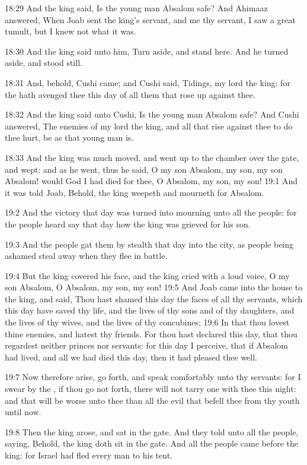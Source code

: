 18:29 And the king said, Is the young man Absalom safe? And Ahimaaz answered, When Joab sent the king's servant, and me thy servant, I saw a great tumult, but I knew not what it was.

18:30 And the king said unto him, Turn aside, and stand here. And he turned aside, and stood still.

18:31 And, behold, Cushi came; and Cushi said, Tidings, my lord the king: for the \LORD hath avenged thee this day of all them that rose up against thee.

18:32 And the king said unto Cushi, Is the young man Absalom safe? And Cushi answered, The enemies of my lord the king, and all that rise against thee to do thee hurt, be as that young man is.

18:33 And the king was much moved, and went up to the chamber over the gate, and wept: and as he went, thus he said, O my son Absalom, my son, my son Absalom! would God I had died for thee, O Absalom, my son, my son!  19:1 And it was told Joab, Behold, the king weepeth and mourneth for Absalom.

19:2 And the victory that day was turned into mourning unto all the people: for the people heard say that day how the king was grieved for his son.

19:3 And the people gat them by stealth that day into the city, as people being ashamed steal away when they flee in battle.

19:4 But the king covered his face, and the king cried with a loud voice, O my son Absalom, O Absalom, my son, my son!  19:5 And Joab came into the house to the king, and said, Thou hast shamed this day the faces of all thy servants, which this day have saved thy life, and the lives of thy sons and of thy daughters, and the lives of thy wives, and the lives of thy concubines; 19:6 In that thou lovest thine enemies, and hatest thy friends. For thou hast declared this day, that thou regardest neither princes nor servants: for this day I perceive, that if Absalom had lived, and all we had died this day, then it had pleased thee well.

19:7 Now therefore arise, go forth, and speak comfortably unto thy servants: for I swear by the \LORD, if thou go not forth, there will not tarry one with thee this night: and that will be worse unto thee than all the evil that befell thee from thy youth until now.

19:8 Then the king arose, and sat in the gate. And they told unto all the people, saying, Behold, the king doth sit in the gate. And all the people came before the king: for Israel had fled every man to his tent.

